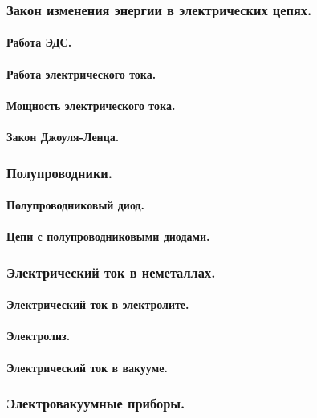 \documentclass{article}
\begin{document}
        \subsubsection{Закон изменения энергии в электрических цепях.}
            \paragraph{Работа ЭДС.}
            \paragraph{Работа электрического тока.}
            \paragraph{Мощность электрического тока.}
            \paragraph{Закон Джоуля-Ленца.}
        \subsubsection{Полупроводники.}
            \paragraph{Полупроводниковый диод.}
            \paragraph{Цепи с полупроводниковыми диодами.}
        \subsubsection{Электрический ток в неметаллах.}
            \paragraph{Электрический ток в электролите.}
            \paragraph{Электролиз.}
            \paragraph{Электрический ток в вакууме.}
        \subsubsection{Электровакуумные приборы.}
    
\end{document}
